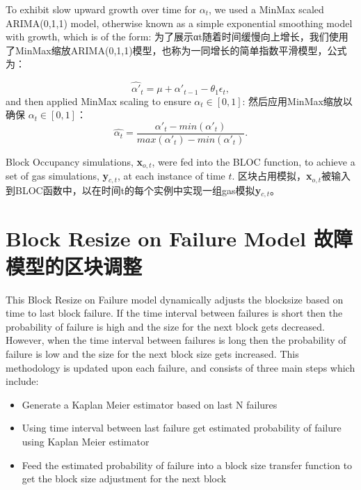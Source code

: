 \documentclass{ctexart}
\begin{document}
To exhibit slow upward growth over time for $\alpha_{t}$, we used a MinMax scaled ARIMA(0,1,1) model, otherwise known as a simple exponential smoothing model with growth, which is of the form:
为了展示αt随着时间缓慢向上增长，我们使用了MinMax缩放ARIMA(0,1,1)模型，也称为一同增长的简单指数平滑模型，公式为：

\begin{equation}
\hat{\alpha'}_{t} = \mu + \alpha'_{t-1} - \theta_{1}\epsilon_{t},
\end{equation}
and then applied MinMax scaling to ensure $\alpha_{t} \in [0,1]$:
然后应用MinMax缩放以确保 $\alpha_{t} \in [0,1]$：
\begin{equation}
\hat{\alpha_{t}} = \dfrac{\alpha'_{t} - min(\alpha'_{t})}{  max(\alpha'_{t}) - min(\alpha'_{t}) }.
\end{equation}

Block Occupancy simulations, \textbf{x}$_{o,t}$, were fed into the BLOC function, to achieve a set of gas simulations, \textbf{y}$_{c,t}$, at each instance of time $t$. 区块占用模拟，\textbf{x}$_{o,t}$被输入到BLOC函数中，以在时间t的每个实例中实现一组gas模拟\textbf{y}$_{c,t}$。

\section{Block Resize on Failure Model 故障模型的区块调整}
\label{appendix:block_resize}

This Block Resize on Failure model dynamically adjusts the blocksize based on time to last block failure. If the time interval between failures is short then the probability of failure is high and the size for the next block gets decreased. However, when the time interval between failures is long then the probability of failure is low and the size for the next block size gets increased. This methodology is updated upon each failure, and consists of three main steps which include:

\begin{itemize}
\item Generate a Kaplan Meier estimator based on last N failures
\item Using time interval between last failure get estimated probability of failure using Kaplan Meier estimator
\item Feed the estimated probability of failure into a block size transfer function to get the block size adjustment for the next block
\end{itemize}
\end{document}
